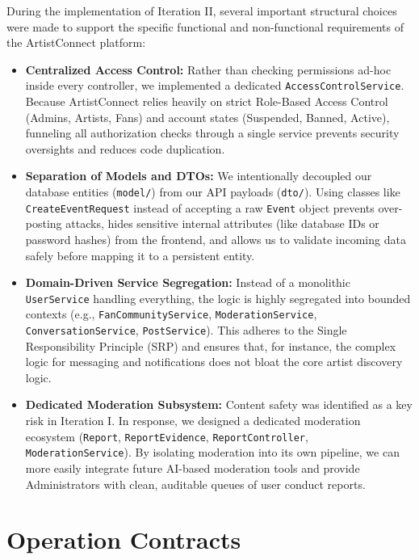 \documentclass[11pt]{report}
\begin{document}
During the implementation of Iteration II, several important structural choices were made to support the specific functional and non-functional requirements of the ArtistConnect platform:

\begin{itemize}
  \item \textbf{Centralized Access Control:} Rather than checking permissions ad-hoc inside every controller, we implemented a dedicated \texttt{AccessControlService}. Because ArtistConnect relies heavily on strict Role-Based Access Control (Admins, Artists, Fans) and account states (Suspended, Banned, Active), funneling all authorization checks through a single service prevents security oversights and reduces code duplication.

  \item \textbf{Separation of Models and DTOs:} We intentionally decoupled our database entities (\texttt{model/}) from our API payloads (\texttt{dto/}). Using classes like \texttt{CreateEventRequest} instead of accepting a raw \texttt{Event} object prevents over-posting attacks, hides sensitive internal attributes (like database IDs or password hashes) from the frontend, and allows us to validate incoming data safely before mapping it to a persistent entity.

  \item \textbf{Domain-Driven Service Segregation:} Instead of a monolithic \texttt{UserService} handling everything, the logic is highly segregated into bounded contexts (e.g., \texttt{FanCommunityService}, \texttt{ModerationService}, \texttt{ConversationService}, \texttt{PostService}). This adheres to the Single Responsibility Principle (SRP) and ensures that, for instance, the complex logic for messaging and notifications does not bloat the core artist discovery logic.

  \item \textbf{Dedicated Moderation Subsystem:} Content safety was identified as a key risk in Iteration I. In response, we designed a dedicated moderation ecosystem (\texttt{Report}, \texttt{ReportEvidence}, \texttt{ReportController}, \texttt{ModerationService}). By isolating moderation into its own pipeline, we can more easily integrate future AI-based moderation tools and provide Administrators with clean, auditable queues of user conduct reports.
\end{itemize}
\chapter{Operation Contracts}
\end{document}

